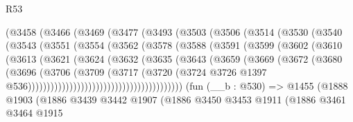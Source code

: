 \begin{lexlean}{R53}
\begin{coremodule}
              (@3458
                (@3466
                  (@3469
                    (@3477
                      (@3493
                        (@3503
                          (@3506
                            (@3514
                              (@3530
                                (@3540
                                  (@3543
                                    (@3551
                                      (@3554
                                        (@3562
                                          (@3578
                                            (@3588
                                              (@3591
                                                (@3599
                                                  (@3602
                                                    (@3610
                                                      (@3613
                                                        (@3621
                                                          (@3624
                                                            (@3632
                                                              (@3635
                                                                (@3643
                                                                  (@3659
                                                                    (@3669
                                                                      (@3672
                                                                        (@3680
                                                                          (@3696
                                                                            (@3706
                                                                              (@3709
                                                                                (@3717
                                                                                  (@3720
                                                                                    (@3724
                                                                                      @3726
                                                                                      @1397
                                                                                      @536)))))))))))))))))))))))))))))))))))))))))
    (fun (__b : @530) =>
    @1455
      (@1888
        @1903
        (@1886
          @3439
          @3442
          @1907
          (@1886
            @3450
            @3453
            @1911
            (@1886
              @3461
              @3464
              @1915

\end{coremodule}
\end{lexlean}
